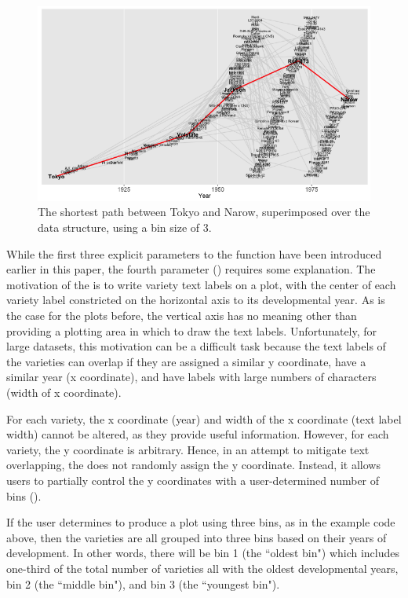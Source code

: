 \documentclass[article,shortnames]{jss}
\begin{document}
\begin{figure}%
    \centering
    \includegraphics[width=\textwidth]{plotTNBin3}
    \caption{The shortest path between Tokyo and Narow, superimposed over the data structure, using a bin size of 3.}
    \label{fig:plotTNBin3}
\end{figure}

While the first three explicit parameters to the function  have been introduced earlier in this paper, the fourth parameter () requires some explanation. The motivation of the  is to write variety text labels on a plot, with the center of each variety label constricted on the horizontal axis to its developmental year. As is the case for the plots before, the vertical axis has no meaning other than providing a plotting area in which to draw the text labels. Unfortunately, for large datasets, this motivation can be a difficult task because the text labels of the varieties can overlap if they are assigned a similar y coordinate, have a similar year (x coordinate), and have labels with large numbers of characters (width of x coordinate).

For each variety, the x coordinate (year) and width of the x coordinate (text label width) cannot be altered, as they provide useful information. However, for each variety, the y coordinate is arbitrary. Hence, in an attempt to mitigate text overlapping, the  does not randomly assign the y coordinate. Instead, it allows users to partially control the y coordinates with a user-determined number of bins ().

If the user determines to produce a plot using three bins, as in the example code above, then the varieties are all grouped into three bins based on their years of development. In other words, there will be bin 1 (the ``oldest bin") which includes one-third of the total number of varieties all with the oldest developmental years, bin 2 (the ``middle bin"), and bin 3 (the ``youngest bin").
\end{document}
